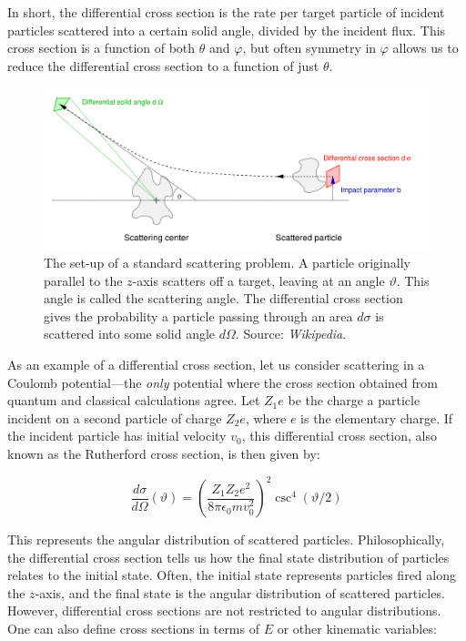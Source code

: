 \documentclass[../main.tex]{subfiles}
\begin{document}
In short, the differential cross section is the rate per target particle of incident particles scattered into a certain solid angle, divided by the incident flux. This cross section is a function of both $\theta$ and $\varphi$, but often symmetry in $\varphi$ allows us to reduce the differential cross section to a function of just $\theta$. 

\begin{figure}[h]
    \centering
    \includegraphics[scale=0.35]{introduction/figs/diffcross.png}
    \caption{The set-up of a standard scattering problem. A particle originally parallel to the $z$-axis scatters off a target, leaving at an angle $\vartheta$. This angle is called the scattering angle. The differential cross section gives the probability a particle passing through an area $d\sigma$ is scattered into some solid angle $d\Omega$. Source: \textit{Wikipedia}.}
    \label{fig:enter-label}
\end{figure}

As an example of a differential cross section, let us consider scattering in a Coulomb potential---the \textit{only} potential where the cross section obtained from quantum and classical calculations agree. Let $Z_1e$ be the charge a particle incident on a second particle of charge $Z_2e$, where $e$ is the elementary charge. If the incident particle has initial velocity $v_0$, this differential cross section, also known as the Rutherford cross section, is then given by: 

\begin{equation}
    \frac{d\sigma}{d\Omega}(\vartheta) = \left(\frac{Z_1 Z_2 e^2}{8 \pi \epsilon_0 m v_0^2}\right)^2 \csc^4{(\vartheta / 2)}
\end{equation}

This represents the angular distribution of scattered particles. Philosophically, the differential cross section tells us how the final state distribution of particles relates to the initial state. Often, the initial state represents particles fired along the $z$-axis, and the final state is the angular distribution of scattered particles. However, differential cross sections are not restricted to angular distributions. One can also define cross sections in terms of $E$ or other kinematic variables:
\end{document}
